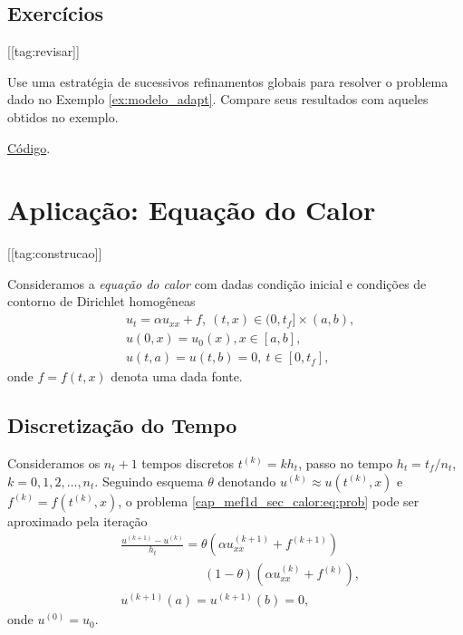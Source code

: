 \subsection{Exercícios}
[[tag:revisar]]

\begin{exer}\label{exer:modelo_refglobal}
  Use uma estratégia de sucessivos refinamentos globais para resolver o problema dado no Exemplo \ref{ex:modelo_adapt}. Compare seus resultados com aqueles obtidos no exemplo.
\end{exer}
\begin{resp}
  \ifispython
  \href{https://github.com/phkonzen/notas/blob/master/src/MetodoElementosFinitos/cap_mef1d/dados/exer_dcr/exer_dcr.py}{Código}.
  \fi  
\end{resp}

\section{Aplicação: Equação do Calor}\label{cap_mef1d_sec_calor}
[[tag:construcao]]

Consideramos a \emph{equação do calor} com dadas condição inicial e condições de contorno de Dirichlet homogêneas
\begin{subequations}\label{cap_mef1d_sec_calor:eq:prob}
  \begin{align}
    &u_t = \alpha u_{xx} + f, ~(t,x)\in (0, t_f]\times (a, b),\\
    &u(0, x) = u_0(x), x\in [a, b],\\
    &u(t, a) = u(t, b) = 0, ~t\in [0, t_f],
  \end{align}
\end{subequations}
onde $f = f(t, x)$ denota uma dada fonte.

\subsection{Discretização do Tempo}

Consideramos os $n_t+1$ tempos discretos $t^{(k)} = k h_t$, passo no tempo $h_t = t_f/n_t$, $k = 0, 1, 2, \dotsc, n_t$. Seguindo esquema $\theta$ denotando $u^{(k)} \approx u\left(t^{(k)}, x\right)$ e $f^{(k)} = f\left(t^{(k)}, x\right)$, o problema \eqref{cap_mef1d_sec_calor:eq:prob} pode ser aproximado pela iteração
\begin{subequations}\label{cap_mef1d_sec_calor:eq:theta}
  \begin{align}
    &\frac{u^{(k+1)} - u^{(k)}}{h_t} = \theta \left(\alpha u^{(k+1)}_{xx} + f^{(k+1)}\right)\nonumber\\
    &\qquad\qquad\qquad\;\; (1-\theta) \left(\alpha u^{(k)}_{xx} + f^{(k)}\right),\\
    &u^{(k+1)}(a) = u^{(k+1)}(b) = 0,
  \end{align}
\end{subequations}
onde $u^{(0)} = u_0$. 

